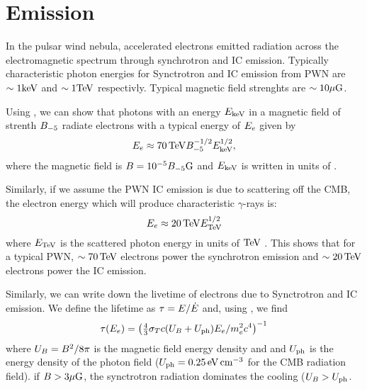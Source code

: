 \section{ Emission}

In the pulsar wind nebula, accelerated electrons emitted radiation across
the electromagnetic spectrum through synchrotron and \ac{IC} emission.
Typically characteristic photon energies for Synctrotron and \ac{IC}
emission from \ac{PWN} are $\sim1\text{keV}$ and $\sim1\text{TeV}$ respectivly.
Typical magnetic field strenghts are $\sim10\mu\text{G}$.

Using , we can show that
photons with an energy $E_\text{keV}$ in a magnetic field of strenth
$B_{-5}$ radiate electrons with a typical energy of
$E_e$ given by
\begin{equation}
  E_e \approx  70\,\text{TeV} B_{-5}^{-1/2} E_\text{keV}^{1/2},
\end{equation}
where the magnetic field is $B=10^{-5}
B_{-5}\text{G}$ and $E_\text{keV}$ is written in units of \kev
\citep{de-jager_2009a_implications-observations}.

Similarly, if we assume the \ac{PWN} \ac{IC} emission is due to scattering
off the \ac{CMB}, the electron energy which will produce characteristic
\tev $\gamma$-rays is:
\begin{equation}
  E_e \approx 20\,\text{TeV} E_\text{TeV}^{1/2}
\end{equation}
where $E_\text{TeV}$ is the scattered photon energy in units of $\text{TeV}$
\citep{de-jager_2009a_implications-observations}.  This shows that for a
typical \ac{PWN}, $\sim70\,\text{TeV}$ electrons power the synchrotron
emission and $\sim20\,\text{TeV}$ electrons power the \ac{IC} emission.

Similarly, we can write down the livetime of electrons due to
Synctrotron and \ac{IC} emission. We define the lifetime as $\tau =
E/\dot{E}$ and, using \cite{rybicki_1979a_radiative-processes},
we find
\begin{equation}
  \tau(E_e) = 
  \left(
  \tfrac{4}{3} \sigma_T c (U_B + U_\text{ph}) 
  E_e/ m_e^2c^4
  \right)^{-1}
\end{equation}
where $U_B = B^2/8\pi$
is the magnetic field energy density and and
$U_\text{ph}$ is the energy density of the photon field
($U_\text{ph}=0.25\,\text{eV}\,\text{cm}^{-3}$
for the \ac{CMB} radiation field).  if $B>3\mu\text{G}$, the synctrotron
radiation dominates the cooling ($U_B >
U_\text{ph}$.

